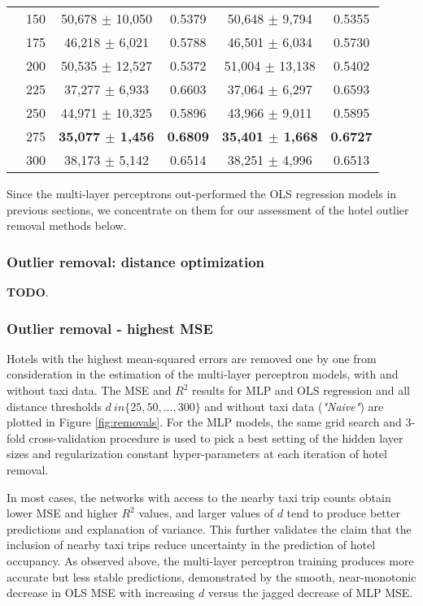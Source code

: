\documentclass[useAMS, usenatbib]{biom}
\begin{document}
\begin{table}
\begin{center}
{\begin{tabular}{||c|c|c|c|c|c||}
 & 150 & 50,678 $\pm$ 10,050 & 0.5379 & 50,648 $\pm$ 9,794 & 0.5355 \\
 & 175 & 46,218 $\pm$ 6,021 & 0.5788 & 46,501 $\pm$ 6,034 & 0.5730 \\
 & 200 & 50,535 $\pm$ 12,527 & 0.5372 & 51,004 $\pm$ 13,138 & 0.5402 \\
 & 225 & 37,277 $\pm$ 6,933 & 0.6603 & 37,064 $\pm$ 6,297 & 0.6593 \\
 & 250 & 44,971 $\pm$ 10,325 & 0.5896 & 43,966 $\pm$ 9,011 & 0.5895 \\
 & 275 & \textbf{35,077 $\pm$ 1,456} & \textbf{0.6809} & \textbf{35,401 $\pm$ 1,668} & \textbf{0.6727} \\
 & 300 & 38,173 $\pm$ 5,142 & 0.6514 & 38,251 $\pm$ 4,996 & 0.6513 \\
 \hline
\end{tabular}
}
\end{center}
\end{table}

Since the multi-layer perceptrons out-performed the OLS regression models in previous sections, we concentrate on them for our assessment of the hotel outlier removal methods below.

\subsubsection{Outlier removal: distance optimization}

\textbf{TODO}.

\subsubsection{Outlier removal - highest MSE}

Hotels with the highest mean-squared errors are removed one by one from consideration in the estimation of the multi-layer perceptron models, with and without taxi data. The MSE and $R^2$ results for MLP and OLS regression and all distance thresholds $d \ in \{25, 50, ..., 300 \}$ and without taxi data (\textit{"Naive"}) are plotted in Figure \ref{fig:removals}. For the MLP models, the same grid search and 3-fold cross-validation procedure is used to pick a best setting of the hidden layer sizes and regularization constant hyper-parameters at each iteration of hotel removal.

In most cases, the networks with access to the nearby taxi trip counts obtain lower MSE and higher $R^2$ values, and larger values of $d$ tend to produce better predictions and explanation of variance. This further validates the claim that the inclusion of nearby taxi trips reduce uncertainty in the prediction of hotel occupancy. As observed above, the multi-layer perceptron training produces more accurate but less stable predictions, demonstrated by the smooth, near-monotonic decrease in OLS MSE with increasing $d$ versus the jagged decrease of MLP MSE. 
\end{document}
